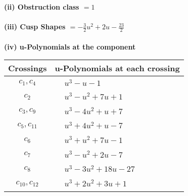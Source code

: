 \documentclass[1p]{elsarticle_modified}
\theoremstyle{definition}
\begin{document}
\flushleft \textbf{(ii) Obstruction class $= 1$}\\~\\
\flushleft \textbf{(iii) Cusp Shapes $= -\frac{3}{2} u^2+2 u-\frac{23}{2}$}\\~\\
\newpage\renewcommand{\arraystretch}{1}
\flushleft \textbf{(iv) u-Polynomials at the component}\newline \\
\begin{tabular}{m{50pt}|m{274pt}}
Crossings & \hspace{64pt}u-Polynomials at each crossing \\
\hline $$\begin{aligned}c_{1},c_{4}\end{aligned}$$&$\begin{aligned}
&u^3- u-1
\end{aligned}$\\
\hline $$\begin{aligned}c_{2}\end{aligned}$$&$\begin{aligned}
&u^3- u^2+7 u+1
\end{aligned}$\\
\hline $$\begin{aligned}c_{3},c_{9}\end{aligned}$$&$\begin{aligned}
&u^3-4 u^2+u+7
\end{aligned}$\\
\hline $$\begin{aligned}c_{5},c_{11}\end{aligned}$$&$\begin{aligned}
&u^3+4 u^2+u-7
\end{aligned}$\\
\hline $$\begin{aligned}c_{6}\end{aligned}$$&$\begin{aligned}
&u^3+u^2+7 u-1
\end{aligned}$\\
\hline $$\begin{aligned}c_{7}\end{aligned}$$&$\begin{aligned}
&u^3- u^2+2 u-7
\end{aligned}$\\
\hline $$\begin{aligned}c_{8}\end{aligned}$$&$\begin{aligned}
&u^3-3 u^2+18 u-27
\end{aligned}$\\
\hline $$\begin{aligned}c_{10},c_{12}\end{aligned}$$&$\begin{aligned}
&u^3+2 u^2+3 u+1
\end{aligned}$\\
\hline
\end{tabular}\\~\\
\end{document}
